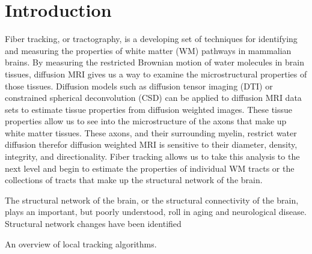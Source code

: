 \section{Introduction}
    Fiber tracking, or tractography, is a developing set of techniques for identifying and measuring the properties of white matter (WM) pathways in mammalian brains. By measuring the restricted Brownian motion of water molecules in brain tissues, diffusion MRI gives us a way to examine the microstructural properties of those tissues. Diffusion models such as diffusion tensor imaging (DTI) or constrained spherical deconvolution (CSD) can be applied to diffusion MRI data sets to estimate tissue properties from diffusion weighted images. These tissue properties allow us to see into the microstructure of the axons that make up white matter tissues. These axons, and their surrounding myelin, restrict water diffusion therefor diffusion weighted MRI is sensitive to their diameter, density, integrity, and directionality. Fiber tracking allows us to take this analysis to the next level and begin to estimate the properties of individual WM tracts or the collections of tracts that make up the structural network of the brain.
    
    The structural network of the brain, or the structural connectivity of the brain, plays an important, but poorly understood, roll in aging and neurological disease. Structural network changes have been identified 

An overview of local tracking algorithms.

